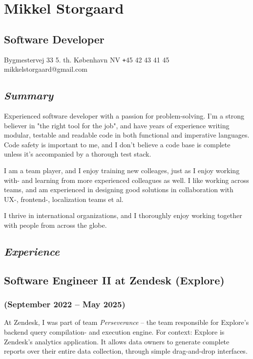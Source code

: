 \documentclass[10pt, a4paper]{article}
\begin{document}
\section*{Mikkel Storgaard}
\subsection*{Software Developer}
Bygmestervej 33 5. th.  København NV \newline
\texttt{+}45 42 43 41 45 \newline
mikkelstorgaard@gmail.com
\subsection*{\textit{Summary}}
Experienced software developer with a passion for problem-solving. I'm a strong believer in "the right tool for the job", and have years of experience writing modular, testable and readable code in both functional and imperative languages.
Code safety is important to me, and I don't believe a code base is complete unless it's accompanied by a thorough test stack.

I am a team player, and I enjoy training new colleages, just as I enjoy working with- and learning from more experienced colleagues as well.
I like working across teams, and am experienced in designing good solutions in collaboration with UX-, frontend-, localization teams et al.

I thrive in international organizations, and I thoroughly enjoy working together with people from across the globe.

\subsection*{\textit{Experience}}
\subsection*{Software Engineer II at Zendesk (Explore)}
\subsubsection*{{\normalfont(September 2022 -- May 2025)}}
At Zendesk, I was part of team \textit{Perseverance} -- the team responsible for Explore's backend query compilation- and execution engine. 
For context: Explore is Zendesk's analytics application. It allows data owners to generate complete reports over their entire data collection, through simple drag-and-drop interfaces.
\end{document}

